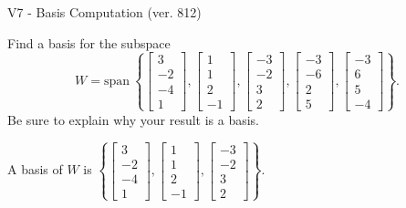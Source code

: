 \begin{exercise}
  \begin{exerciseTitle}V7 - Basis Computation (ver. 812)\end{exerciseTitle}
  \begin{exerciseStatement}
    Find a basis for the subspace 
\[W=\mathrm{span}\ \left\{\left[\begin{array}{r}
3 \\
-2 \\
-4 \\
1
\end{array}\right] , \left[\begin{array}{r}
1 \\
1 \\
2 \\
-1
\end{array}\right] , \left[\begin{array}{r}
-3 \\
-2 \\
3 \\
2
\end{array}\right] , \left[\begin{array}{r}
-3 \\
-6 \\
2 \\
5
\end{array}\right] , \left[\begin{array}{r}
-3 \\
6 \\
5 \\
-4
\end{array}\right]\right\}.\]
 Be sure to explain why your result is a basis.


  \end{exerciseStatement}
  \begin{exerciseAnswer}
   A basis of \(W\) is  \(\left\{\left[\begin{array}{r}
3 \\
-2 \\
-4 \\
1
\end{array}\right] , \left[\begin{array}{r}
1 \\
1 \\
2 \\
-1
\end{array}\right] , \left[\begin{array}{r}
-3 \\
-2 \\
3 \\
2
\end{array}\right]\right\}\).
  


  \end{exerciseAnswer}
\end{exercise}